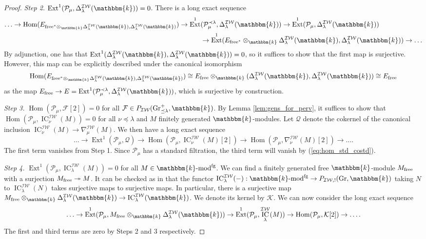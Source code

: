 \documentclass{amsart}
\renewcommand{\k}{\mathbbm{k}}
\newcommand{\scrF}{\mathcal{F}}
\newcommand{\scrK}{\mathcal{K}}
\newcommand{\scrP}{\mathcal{P}}
\newcommand{\IW}{\mathcal{IW}}
\DeclareMathOperator{\Hom}{Hom}
\DeclareMathOperator{\Ext}{Ext}
\renewcommand{\mod}[1]{#1\textnormal{-mod}}
\DeclareMathOperator{\IC}{IC}
\newcommand{\scrQ}{\mathcal{Q}}
\DeclareMathOperator{\Gr}{Gr}
\DeclareMathOperator{\fg}{fg}
\theoremstyle{definition}
\begin{document}
\begin{proof}
        \emph{Step 2.} $\Ext^1 (\scrP_{\mu}, \Delta_{\lambda}^{\IW} (\k)) = 0$. There is a long exact sequence
        \begin{align*}
            \ldots \to \Hom (E_{\textnormal{free}^* \otimes_{\k} \Delta_{\lambda}^{\IW} (\k), \Delta_{\lambda}^{\IW} (\k)}) \to \Ext^1& (\scrP_{\mu}^{\prec \lambda}, \Delta_{\lambda}^{\IW} (\k)) \to \Ext^1 (\scrP_{\mu}, \Delta_{\lambda}^{\IW} (\k)) \\
            &\to \Ext^1 (E_{\textnormal{free}^*} \otimes_{\k} \Delta_{\lambda}^{\IW} (\k), \Delta_{\lambda}^{\IW} (\k)) \to \ldots
        \end{align*}
        By adjunction, one has that $\Ext^1 (\Delta_{\lambda}^{\IW} (\k), \Delta_{\lambda}^{\IW} (\k)) = 0$, so it suffices to show that the first map is surjective.
        However, this map can be explicitly described under the canonical isomorphism 
        \[\Hom (E_{\textnormal{free}^* \otimes_{\k} \Delta_{\lambda}^{\IW} (\k), \Delta_{\lambda}^{\IW} (\k)}) \cong E_{\textnormal{free}} \otimes_{\k} (\Delta_{\lambda}^{\IW} (\k), \Delta_{\lambda}^{\IW} (\k)) \cong  E_{\textnormal{free}}\]
        as the map $E_{\textnormal{free}} \to E = \Ext^1 (\scrP_{\mu}^{\prec \lambda}, \Delta_{\lambda}^{\IW} (\k))$, which is surjective by construction.

        \emph{Step 3.} $\Hom (\scrP_{\mu}, \scrF [2]) = 0$ for all $\scrF \in P_{\IW} (\Gr_{\preceq \lambda}^+, \k)$. By Lemma \ref{lem:gens_for_perv}, it suffices to show that $\Hom (\scrP_{\mu}, \IC_{\nu}^{\IW} (M)) = 0$ for all $\nu \preceq \lambda$ and $M$ finitely generated $\k$-modules.
        Let $\scrQ$ denote the cokernel of the canonical inclusion $\IC_{\nu}^{\IW} (M) \to \nabla_{\mu}^{\IW} (M)$. We then have a long exact sequence
        \[\ldots \to \Ext^1 (\scrP_{\mu}, \scrQ) \to \Hom (\scrP_{\mu}, \IC_{\nu}^{\IW} (M) [2]) \to \Hom (\scrP_{\mu}, \nabla_{\nu}^{\IW} (M) [2]) \to \ldots.\]
        The first term vanishes from Step 1. Since $\scrP_{\mu}$ has a standard filtration, the third term will vanish by (\ref{eq:hom_std_costd}).

        \emph{Step 4.} $\Ext^1 (\scrP_{\mu}, \IC_{\lambda}^{\IW} (M)) = 0$ for all $M \in \mod{\k}^{\fg}$. 
        We can find a finitely generated free $\k$-module $M_{\textnormal{free}}$ with a surjection $M_{\textnormal{free}} \twoheadrightarrow M$.
It can be checked as in \cite[Lemma 3.3.5]{Ac} that the functor $\IC_{\lambda}^{\IW} (-) : \mod{\k}^{\fg} \to P_{\IW, !} (\Gr, \k)$ taking $N$ to $\IC_{\lambda}^{\IW} (N)$ takes surjective maps to surjective maps.
In particular, there is a surjective map $M_{\textnormal{free}} \otimes_{\k} \Delta_{\lambda}^{\IW} (\k) \to \IC_{\lambda}^{\IW} (\k)$. We denote its kernel by $\scrK$.
We can now consider the long exact sequence
\[\ldots \to \Ext^1 (\scrP_{\mu}, M_{\textnormal{free}} \otimes_{\k} \Delta_{\lambda}^{\IW} (\k)) \to \Ext^1 (\scrP_{\mu}, \IC_{\lambda}^{\IW} (M)) \to \Hom (\scrP_{\mu}, \scrK [2]) \to \ldots.\]
The first and third terms are zero by Steps 2 and 3 respectively.


\end{proof}
\end{document}
